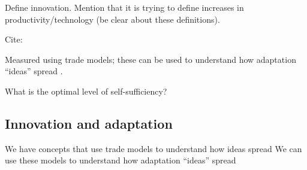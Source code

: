 \documentclass[10 pt]{article}
\begin{document}
\begin{outline}


\begin{blist}

\item Define innovation. Mention that it is trying to define increases in productivity/technology (be clear about these definitions).

\item Cite:  \textcite{PNJ10,ZZH12}

\item Measured using trade models; these can be used to understand how adaptation ``ideas'' spread \parencite{BO-wp}.
\end{blist}


\begin{blist}
\item  %
What is the optimal level of self-sufficiency? %
\end{blist}

\end{outline}
\subsection{Innovation and adaptation}

\begin{blist}

\item We have concepts that use trade models to understand how ideas spread \parencite{BO-wp}
We can use these models to understand how adaptation ``ideas'' spread 


\end{blist}
\end{document}
